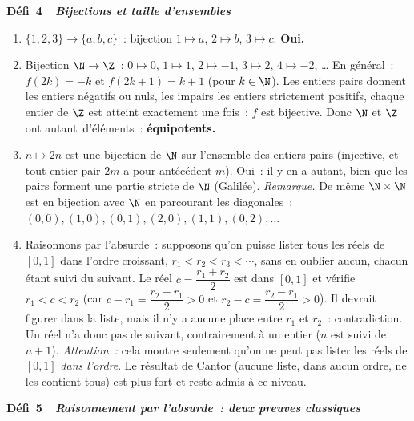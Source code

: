 \noindent{}
{\color{BO}\bfseries\small D\'efi~4~\textendash\ \textit{Bijections et taille d'ensembles}}
\par\smallskip

\begin{enumerate}
  \item $\{1,2,3\}\to\{a,b,c\}$~: bijection $1\mapsto a$, $2\mapsto b$, $3\mapsto c$. \textbf{Oui.}
  \item Bijection $\N\to\Z$~: $0\mapsto0$, $1\mapsto1$, $2\mapsto-1$, $3\mapsto2$, $4\mapsto-2$, \ldots
        En g\'en\'eral~: $f(2k)=-k$ et $f(2k+1)=k+1$ (pour $k\in\N$).
        Les entiers pairs donnent les entiers n\'egatifs ou nuls, les impairs les entiers strictement positifs,
        chaque entier de $\Z$ est atteint exactement une fois~: $f$ est bijective.
        Donc $\N$ et $\Z$ ont \og autant\fg\ d'\'el\'ements~: \textbf{\'equipotents.}
  \item $n\mapsto2n$ est une bijection de $\N$ sur l'ensemble des entiers pairs
        (injective, et tout entier pair $2m$ a pour ant\'ec\'edent $m$).
        Oui~: il y en a autant, bien que les pairs forment une partie stricte de $\N$ (Galil\'ee).
        \emph{Remarque.} De m\^eme $\N\times\N$ est en bijection avec $\N$ en parcourant les diagonales~:
        $(0,0),(1,0),(0,1),(2,0),(1,1),(0,2),\ldots$
  \item Raisonnons par l'absurde~: supposons qu'on puisse lister tous les r\'eels de $[0,1]$
        dans l'ordre croissant, $r_1<r_2<r_3<\cdots$, sans en oublier aucun, chacun \'etant
        suivi du \og suivant\fg.
        Le r\'eel $c=\dfrac{r_1+r_2}{2}$ est dans $[0,1]$ et v\'erifie $r_1<c<r_2$
        (car $c-r_1=\dfrac{r_2-r_1}{2}>0$ et $r_2-c=\dfrac{r_2-r_1}{2}>0$).
        Il devrait figurer dans la liste, mais il n'y a aucune place entre $r_1$ et $r_2$~:
        contradiction. Un r\'eel n'a donc pas de \og suivant\fg, contrairement \`a un entier
        ($n$ est suivi de $n+1$).
        \emph{Attention~:} cela montre seulement qu'on ne peut pas lister les r\'eels de $[0,1]$
        \emph{dans l'ordre}. Le r\'esultat de Cantor (aucune liste, dans aucun ordre, ne les
        contient tous) est plus fort et reste admis \`a ce niveau.
\end{enumerate}

\noindent{}
{\color{BO}\bfseries\small D\'efi~5~\textendash\ \textit{Raisonnement par l'absurde~: deux preuves classiques}}
\par\smallskip

